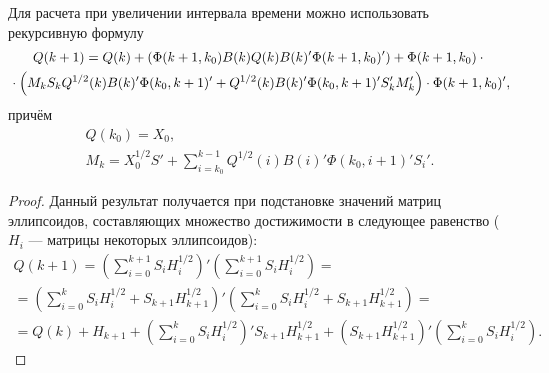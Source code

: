 \documentclass[10pt, a4paper]{article}
\begin{document}
\begin{theorem}
Для расчета при увеличении интервала времени можно использовать рекурсивную формулу
	\begin{gather}
		\notag Q(k+1) = Q(k) + \left(\Phi(k+1,k_0)B(k)Q(k)B(k)'\Phi(k+1,k_0)'\right) + \Phi(k+1,k_0)\cdot {}\\
		{} \cdot \left( M_k S_k Q^{1/2}(k)B(k)'\Phi(k_0,k+1)' + Q^{1/2}(k)B(k)'\Phi(k_0,k+1)'S_k'M_k' \right) \cdot \Phi(k+1,k_0)',
	\end{gather}
	причём
	\begin{gather}
		Q(k_0) = X_0,\\
		M_k = X_0^{1/2}S'+\sum\limits_{i=k_0}^{k-1}Q^{1/2}(i)B(i)'\Phi(k_0,i+1)'S_i'.
	\end{gather}
\end{theorem}
\begin{proof}
Данный результат получается при подстановке значений матриц эллипсоидов, составляющих множество достижимости в следующее равенство ($H_i$ --- матрицы некоторых эллипсоидов):
\begin{gather}
	Q(k+1) = \left(\sum\limits_{i=0}^{k+1}S_iH_i^{1/2}\right)'\left(\sum\limits_{i=0}^{k+1}S_iH_i^{1/2}\right) = \\
	= \left(\sum\limits_{i=0}^{k}S_iH_i^{1/2} + S_{k+1}H_{k+1}^{1/2} \right)'\left(\sum\limits_{i=0}^{k}S_iH_i^{1/2} + S_{k+1}H_{k+1}^{1/2}\right) = \\
	= Q(k) + H_{k+1} + \left(\sum\limits_{i=0}^{k}S_iH_i^{1/2}\right)' S_{k+1}H_{k+1}^{1/2} +
	\left(  S_{k+1}H_{k+1}^{1/2} \right)'\left(\sum\limits_{i=0}^{k}S_iH_i^{1/2}\right).
\end{gather}
\end{proof}
\end{document}
